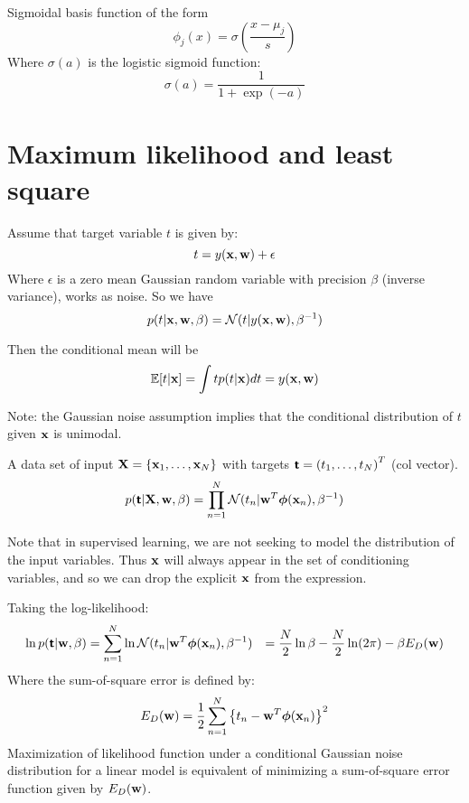 Sigmoidal basis function of the form
\begin{equation}
    \phi_j(x) = \sigma\left( \frac{x-\mu_j}{s} \right)
\end{equation}
Where $\sigma(a)$ is the logistic sigmoid function:
\begin{equation}
    \sigma(a) = \frac{1}{1+\exp(-a)}
\end{equation}

\section{Maximum likelihood and least square}
Assume that target variable $t$ is given by:
\begin{equation}
    t = y(\mathbf{x}, \mathbf{w}) + \epsilon
\end{equation}
Where $\epsilon$ is a zero mean Gaussian random variable with precision
$\beta$ (inverse variance), works as noise. So we have
\begin{equation}
    p(t|\mathbf{x}, \mathbf{w}, \beta) = \mathcal{N}(t|y(\mathbf{x}, \mathbf{w}), \beta^{-1})
\end{equation}

Then the conditional mean will be 
\begin{equation}
    \mathbb{E}[t|\mathbf{x}] = \int t p(t|\mathbf{x}) dt = y(\mathbf{x}, \mathbf{w})
\end{equation}

Note: the Gaussian noise assumption implies that the conditional
distribution of $t$ given $\mathbf{x}$ is unimodal.

A data set of input $\mathbf{X} = \left\{ \mathbf{x}_1, \dots, \mathbf{x}_N \right\}$
with targets $\boldsymbol{\mathsf{t}}={(t_1, \dots, t_N)}^T$ (col vector). 
\begin{equation}
    p(\boldsymbol{\mathsf{t}}|\mathbf{X}, \mathbf{w}, \beta)= \prod_{n=1}^N \mathcal{N}(t_n|\mathbf{w}^T
    \boldsymbol\phi(\mathbf{x}_n), \beta^{-1})
\end{equation}

Note that in supervised learning, we are not seeking to model the
distribution of the input variables. Thus $\mathbf{x}$ will always appear in the
set of conditioning variables, and so we can drop the explicit $\mathbf{x}$ from
the expression.

Taking the log-likelihood:
\begin{align}
    \ln p(\boldsymbol{\mathsf{t}}| \mathbf{w}, \beta) &= \sum_{n=1}^N \ln
    \mathcal{N}(t_n|\mathbf{w}^T\boldsymbol\phi(\mathbf{x}_n), \beta^{-1})
    &=\frac{N}{2} \ln \beta - \frac{N}{2}\ln(2\pi) - \beta E_D(\mathbf{w})
    \label{lin-likelihood}
\end{align}
Where the sum-of-square error is defined by:
\begin{equation}
    E_D(\mathbf{w}) = \frac{1}{2}\sum_{n=1}^N {\left\{ t_n - \mathbf{w}^T
    \boldsymbol\phi(\mathbf{x}_n) \right\}}^2
\end{equation}
Maximization of likelihood function under a conditional Gaussian noise
distribution for a linear model is equivalent of minimizing a
sum-of-square error function given by $E_D(\mathbf{w})$.

